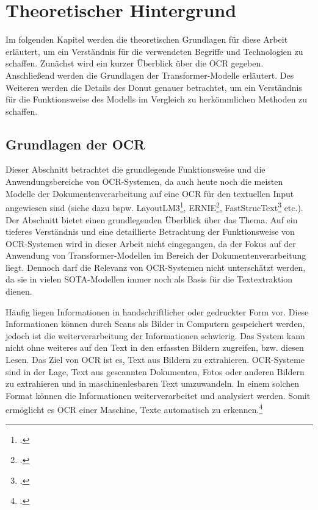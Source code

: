 \chapter{Theoretischer Hintergrund}
Im folgenden Kapitel werden die theoretischen Grundlagen für diese Arbeit erläutert, um ein Verständnis für die verwendeten Begriffe und Technologien zu schaffen. Zunächst wird ein kurzer Überblick über die \ac{OCR} gegeben. Anschließend werden die Grundlagen der Transformer-Modelle erläutert. Des Weiteren werden die Details des \ac{Donut} genauer betrachtet, um ein Verständnis für die Funktionsweise des Modells im Vergleich zu herkömmlichen Methoden zu schaffen.

\section{Grundlagen der OCR}
Dieser Abschnitt betrachtet die grundlegende Funktionsweise und die Anwendungsbereiche von OCR-Systemen, da auch heute noch die meisten Modelle der Dokumentenverarbeitung auf eine OCR für den textuellen Input angewiesen sind (siehe dazu bspw. LayoutLM3\footcites[Vgl. dazu ausführlich][]{huang_layoutlmv3_2022}, ERNIE\footcites[Vgl. dazu ausführlich][]{peng_ernie-layout_2022}, FastStrucText\footcites[Vgl. dazu ausführlich][]{zhai_fast-structext_2023} etc.). Der Abschnitt bietet einen grundlegenden Überblick über das Thema. Auf ein tieferes Verständnis und eine detaillierte Betrachtung der Funktionsweise von OCR-Systemen wird in dieser Arbeit nicht eingegangen, da der Fokus auf der Anwendung von Transformer-Modellen im Bereich der Dokumentenverarbeitung liegt. Dennoch darf die Relevanz von OCR-Systemen nicht unterschätzt werden, da sie in vielen \ac{SOTA}-Modellen immer noch als Basis für die Textextraktion dienen. 

Häufig liegen Informationen in handschriftlicher oder gedruckter Form vor. Diese Informationen können durch Scans als Bilder in Computern gespeichert werden, jedoch ist die weiterverarbeitung der Informationen schwierig. Das System kann nicht ohne weiteres auf den Text in den erfassten Bildern zugreifen, bzw. diesen Lesen. Das Ziel von OCR ist es, Text aus Bildern zu extrahieren. OCR-Systeme sind in der Lage, Text aus gescannten Dokumenten, Fotos oder anderen Bildern zu extrahieren und in maschinenlesbaren Text umzuwandeln. In einem solchen Format können die Informationen weiterverarbeitet und analysiert werden. Somit ermöglicht es OCR einer Maschine, Texte automatisch zu erkennen.\footcites[Vgl.][S.244]{hamad_detailed_2016}

